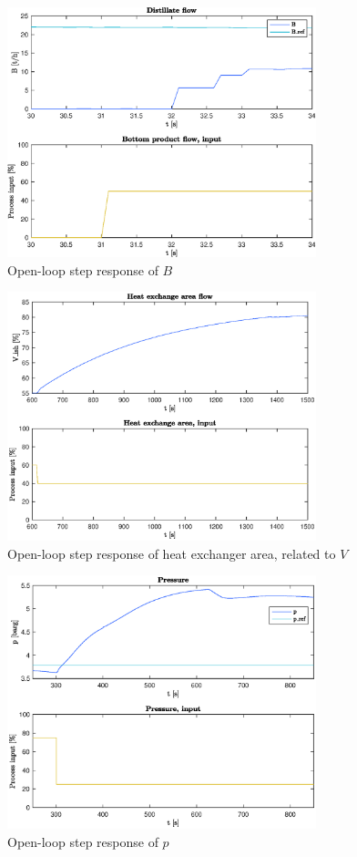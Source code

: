 \documentclass[12pt]{article}
\begin{document}
\begin{figure}
\centering
\includegraphics[width=0.8\textwidth]{../Systemanalyse/Log_Data_to_Matlab/Figurer/Stegeksperimenter/FC1019.eps}
\caption{Open-loop step response of $B$}
\label{fig:ol_step_FC1019}
\end{figure}

\begin{figure}
\centering
\includegraphics[width=0.8\textwidth]{../Systemanalyse/Log_Data_to_Matlab/Figurer/Stegeksperimenter/LC1028.eps}
\caption{Open-loop step response of heat exchanger area, related to $V$}
\label{fig:ol_step_LC1028}
\end{figure}

\begin{figure}
\centering
\includegraphics[width=0.8\textwidth]{../Systemanalyse/Log_Data_to_Matlab/Figurer/Stegeksperimenter/PC1024.eps}
\caption{Open-loop step response of $p$}
\label{fig:ol_step_PC1024}
\end{figure}
\end{document}
